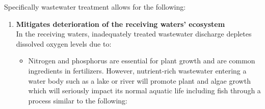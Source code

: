 \documentclass{article}
\begin{document}
Specifically wastewater treatment allows for the following:

\begin{enumerate}
\item \textbf{Mitigates deterioration of the receiving waters' ecosystem }\\
In the receiving waters, inadequately treated wastewater discharge depletes dissolved oxygen levels due to:

\begin{itemize}

\item Nitrogen and phosphorus are essential for plant growth and are common ingredients in fertilizers. However, nutrient-rich wastewater entering a water body such as a lake or river will promote plant and algae growth which will seriously impact its normal aquatic life including fish through a process similar to the following:


\end{itemize}
\end{enumerate}
\end{document}
